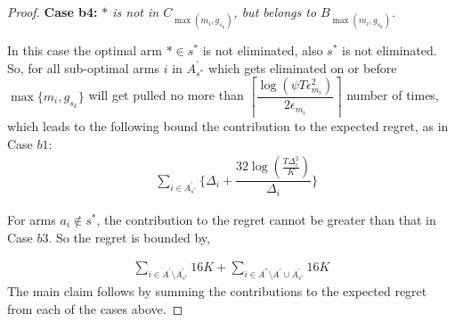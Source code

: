\begin{proof}
\textbf{Case b4:} \textit{${*}$ is not in $C_{\max(m_{i},g_{s_{k}})}$, but belongs to $B_{\max(m_{i},g_{s_{k}})}$.}

In this case the optimal arm ${*}\in s^{*}$ is not eliminated, also $s^{*}$ is not eliminated. So, for all sub-optimal arms $i$ in $A_{s^*}^{'}$ which gets eliminated on or before $\max \lbrace m_{i},g_{s_{k}} \rbrace$ will get pulled no more than $ \left\lceil\dfrac{\log{(\psi T\epsilon_{m_{i}}^{2})}}{2\epsilon_{m_{i}}}\right\rceil$ number of times, which leads to the following bound the contribution to the expected regret, as in Case $b1$:
\begin{align*}
 &\sum_{i\in A_{s^*}^{'}}\bigg\lbrace \Delta_{i}+\dfrac{32\log{(\frac{T\Delta_i^2}{K})}}{\Delta_{i}} \bigg\rbrace 
\end{align*} 

For arms $a_i \notin s^*$, the contribution to the regret cannot be greater than that in Case $b3$. So the regret is bounded by,

\begin{align*}
\sum_{i\in A^{'}\setminus A_{s^*}^{'}} 16K +\sum_{i\in A^{''}\setminus A^{'} \cup A_{s^*}^{'}} 16K
\end{align*}
The main claim follows by summing the contributions to the expected regret from each of the cases above.
\end{proof}
